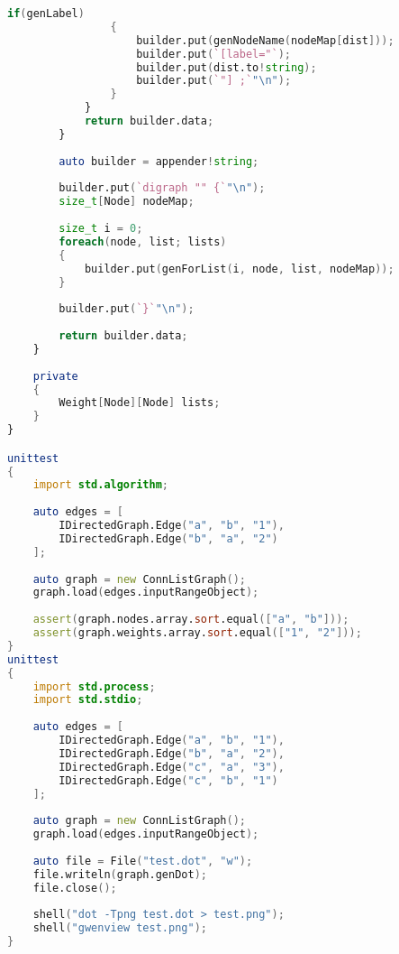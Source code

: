 \documentclass[russian,utf8,emptystyle]{eskdtext}
\begin{document}
\begin{lstlisting}[language=D]
                if(genLabel)
                {
                    builder.put(genNodeName(nodeMap[dist]));
                    builder.put(`[label="`);
                    builder.put(dist.to!string);
                    builder.put(`"] ;`"\n"); 
                }
            }
            return builder.data;
        }
        
        auto builder = appender!string;
        
        builder.put(`digraph "" {`"\n");
        size_t[Node] nodeMap;
        
        size_t i = 0;
        foreach(node, list; lists)
        {
            builder.put(genForList(i, node, list, nodeMap));
        }
        
        builder.put(`}`"\n");
        
        return builder.data;
    }
    
    private
    {
        Weight[Node][Node] lists;
    }
}

unittest
{
    import std.algorithm;
    
    auto edges = [
        IDirectedGraph.Edge("a", "b", "1"),
        IDirectedGraph.Edge("b", "a", "2")
    ]; 
    
    auto graph = new ConnListGraph();
    graph.load(edges.inputRangeObject);
    
    assert(graph.nodes.array.sort.equal(["a", "b"]));
    assert(graph.weights.array.sort.equal(["1", "2"]));
}
unittest
{
    import std.process;
    import std.stdio;
    
    auto edges = [
        IDirectedGraph.Edge("a", "b", "1"),
        IDirectedGraph.Edge("b", "a", "2"),
        IDirectedGraph.Edge("c", "a", "3"),
        IDirectedGraph.Edge("c", "b", "1")
    ];
    
    auto graph = new ConnListGraph();
    graph.load(edges.inputRangeObject);
    
    auto file = File("test.dot", "w");
    file.writeln(graph.genDot);
    file.close();
    
    shell("dot -Tpng test.dot > test.png");
    shell("gwenview test.png");
}
\end{lstlisting}
\end{document}
